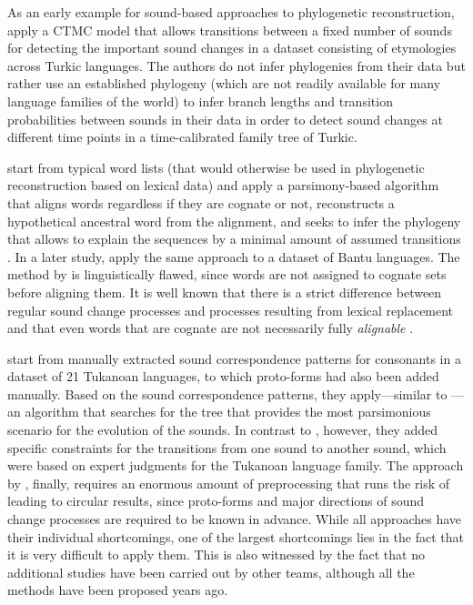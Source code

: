 \documentclass[10pt, a4paper]{article}
\begin{document}
As an early example for sound-based approaches to phylogenetic reconstruction, \citet{hruschka2015detecting} apply a CTMC model that allows transitions between a fixed number of sounds for detecting the important sound changes in a dataset consisting of etymologies across Turkic languages. The authors do not infer phylogenies from their data but rather use an established phylogeny (which are not readily available for many language families of the world) to infer branch lengths and transition probabilities between sounds in their data in order to detect sound changes at different time points in a time-calibrated family tree of Turkic.

\citet{Wheeler2015b} start from typical word lists (that would otherwise be used in phylogenetic reconstruction based on lexical data) and apply a parsimony-based algorithm that aligns words regardless if they are cognate or not, reconstructs a hypothetical ancestral word from the alignment, and seeks to infer the phylogeny that allows to explain the sequences by a minimal amount of assumed transitions \citep{Sankoff1975}. In a later study, \citet{Whiteley2019} apply the same approach to a dataset of Bantu languages. The method by \citet{Wheeler2015b} is linguistically flawed, since words are not assigned to cognate sets before aligning them. It is well known that there is a strict difference between regular sound change processes and processes resulting from lexical replacement \citep{Hall2010} and that even words that are cognate are not necessarily fully \emph{alignable}
\citep[10]{Schweikhard2020}.


\citet{Chacon2015a} start from manually extracted sound correspondence patterns for consonants in a dataset of 21 Tukanoan languages, to which proto-forms had also been added manually. Based on the sound correspondence patterns, they apply---similar to \citet{Wheeler2015b}---an algorithm that searches for the tree that provides the most parsimonious scenario for the evolution of the sounds. In contrast to \citet{Wheeler2015b}, however, they added specific constraints for the transitions from one sound to another sound, which were based on expert judgments for the Tukanoan language family. The approach by \citet{Chacon2015a}, finally, requires an enormous amount of preprocessing that runs the risk of leading to circular results, since proto-forms and major directions of sound change processes are required to be known in advance. While all approaches have their individual shortcomings, one of the largest shortcomings lies in the fact that it is very difficult to apply them. This is also witnessed by the fact that no additional studies have been carried out by other teams, although all the methods have been proposed years ago.
\end{document}
